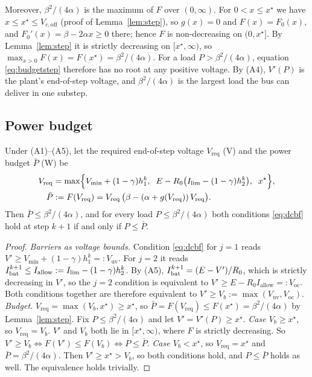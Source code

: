 Moreover, $\beta^2/(4\alpha)$ is the maximum of $F$ over $(0,\infty)$. For $0<x\le x^\star$ we have $x\le x^\star\le V_{c,\mathrm{off}}$ (proof of Lemma~\ref{lem:step}), so $g(x)=0$ and $F(x)=F_0(x)$, and $F_0'(x)=\beta-2\alpha x\ge0$ there; hence $F$ is non-decreasing on $(0,x^\star]$. By Lemma~\ref{lem:step} it is strictly decreasing on $[x^\star,\infty)$, so $\max_{x>0}F(x)=F(x^\star)=\beta^2/(4\alpha)$. For a load $P>\beta^2/(4\alpha)$, equation \eqref{eq:budgetstep} therefore has no root at any positive voltage. By (A4), $V'(P)$ is the plant's end-of-step voltage, and $\beta^2/(4\alpha)$ is the largest load the bus can deliver in one substep.

\subsection{Power budget}
\begin{proposition}\label{prop:budget}
Under (A1)--(A5), let the required end-of-step voltage $V_{\mathrm{req}}$ (V) and the power budget $\bar P$ (W) be
\begin{align*}
V_{\mathrm{req}} &= \max\Bigl\{V_{\min}+(1-\gamma)h_1^k,\;\; E - R_0\bigl(I_{\lim}-(1-\gamma)h_2^k\bigr),\;\; x^\star\Bigr\},\\
\bar P &:= F(V_{\mathrm{req}}) = V_{\mathrm{req}}\,\bigl(\beta-(\alpha + g(V_{\mathrm{req}}))\,V_{\mathrm{req}}\bigr).
\end{align*}
Then $\bar P\le\beta^2/(4\alpha)$, and for every load $P \le \beta^2/(4\alpha)$ both conditions \eqref{eq:dcbf} hold at step $k+1$ if and only if $P \le \bar P$.
\end{proposition}
\begin{proof}
\emph{Barriers as voltage bounds.} Condition \eqref{eq:dcbf} for $j=1$ reads $V' \ge V_{\min}+(1-\gamma)h_1^k =: V_{\mathrm{uv}}$. For $j=2$ it reads $I_{\mathrm{bat}}^{k+1} \le I_{\mathrm{allow}} := I_{\lim}-(1-\gamma)h_2^k$. By (A5), $I_{\mathrm{bat}}^{k+1}=(E-V')/R_0$, which is strictly decreasing in $V'$, so the $j=2$ condition is equivalent to $V' \ge E - R_0 I_{\mathrm{allow}} =: V_{\mathrm{oc}}$. Both conditions together are therefore equivalent to $V'\ge V_b := \max(V_{\mathrm{uv}},V_{\mathrm{oc}})$.
\emph{Budget.} $V_{\mathrm{req}} = \max(V_b, x^\star)\ge x^\star$, so $\bar P = F(V_{\mathrm{req}}) \le F(x^\star) = \beta^2/(4\alpha)$ by Lemma~\ref{lem:step}. Fix $P\le\beta^2/(4\alpha)$ and let $V'=V'(P)\ge x^\star$.
\emph{Case $V_b \ge x^\star$}, so $V_{\mathrm{req}}=V_b$. $V'$ and $V_b$ both lie in $[x^\star,\infty)$, where $F$ is strictly decreasing. So $V'\ge V_b \iff F(V')\le F(V_b) \iff P\le\bar P$.
\emph{Case $V_b < x^\star$}, so $V_{\mathrm{req}}=x^\star$ and $\bar P=\beta^2/(4\alpha)$. Then $V'\ge x^\star > V_b$, so both conditions hold, and $P\le\bar P$ holds as well. The equivalence holds trivially.
\end{proof}
